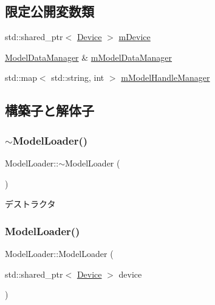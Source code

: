 \subsection*{限定公開変数類}
\begin{DoxyCompactItemize}
\item 
std\+::shared\+\_\+ptr$<$ \mbox{\hyperlink{class_device}{Device}} $>$ \mbox{\hyperlink{class_model_loader_a2e5b33970d8a71e5851e3b51b7980fa8}{m\+Device}}
\item 
\mbox{\hyperlink{class_model_data_manager}{Model\+Data\+Manager}} \& \mbox{\hyperlink{class_model_loader_a5877a5f2d2ec8db87cdcbf0a87c8587b}{m\+Model\+Data\+Manager}}
\item 
std\+::map$<$ std\+::string, int $>$ \mbox{\hyperlink{class_model_loader_a8d1002a30494635ec76972f3354f1ba9}{m\+Model\+Handle\+Manager}}
\end{DoxyCompactItemize}


\subsection{構築子と解体子}
\mbox{\label{class_model_loader_a4015291af96be2ea657577bdf4fb29f4}} 
\subsubsection{\texorpdfstring{$\sim$\+Model\+Loader()}{~ModelLoader()}}
{\footnotesize\ttfamily Model\+Loader\+::$\sim$\+Model\+Loader (\begin{DoxyParamCaption}{ }\end{DoxyParamCaption})\hspace{0.3cm}{\ttfamily [virtual]}}



デストラクタ 

\mbox{\label{class_model_loader_a0e7c5aa28d4772857b1bab0a9ca7428f}} 
\subsubsection{\texorpdfstring{Model\+Loader()}{ModelLoader()}}
{\footnotesize\ttfamily Model\+Loader\+::\+Model\+Loader (\begin{DoxyParamCaption}\item[{std\+::shared\+\_\+ptr$<$ \mbox{\hyperlink{class_device}{Device}} $>$}]{device }\end{DoxyParamCaption})\hspace{0.3cm}{\ttfamily [protected]}}



